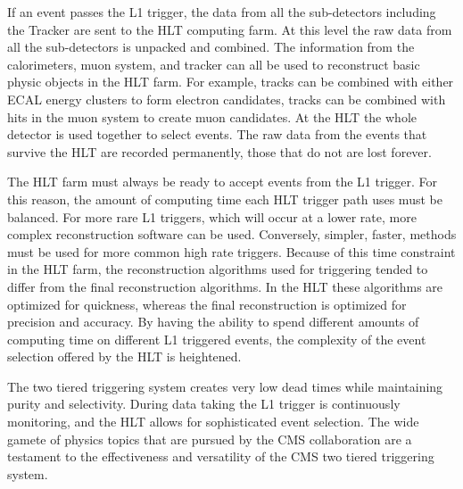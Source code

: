     If an event passes the L1 trigger, the data from all the sub-detectors
      \DIFdelbegin {}\DIFdelend including the Tracker are sent to the HLT computing farm. 
    At this level the raw data from all the sub-detectors is unpacked and 
      combined.
    The information from the calorimeters, muon system, and tracker can all 
      be used to reconstruct basic physic objects in the HLT farm. 
    For example, tracks can be combined with either ECAL energy clusters to 
      form electron candidates, tracks can be combined with hits in the muon
      system to create muon candidates.
    At the HLT the whole detector is used together to select events.
    The raw data from the events that survive the HLT are recorded permanently,
      those that do not are lost forever. 

    The HLT farm must always be ready to accept events from the L1 trigger.
    For this reason, the amount of computing time each HLT trigger path uses
      must be balanced.
    For more rare L1 triggers, which will occur at a lower rate, more 
      complex reconstruction software can be used.
    Conversely, simpler, faster, methods must be used for more common high
      rate triggers. 
    Because of this time constraint in the HLT farm, the reconstruction 
      algorithms used for triggering tended to differ from the final 
      reconstruction algorithms.
    In the HLT these algorithms are optimized for quickness, whereas the final 
      reconstruction is optimized for precision and accuracy.
    By having the ability to spend different amounts of computing time on 
      different L1 triggered events, the complexity of the event selection 
      offered by the HLT is heightened. 

    The two tiered triggering system creates very low dead times while 
      maintaining purity and selectivity.
    During data taking the L1 trigger is continuously monitoring, and the HLT
      allows for sophisticated event selection.
    The wide gamete of physics topics that are pursued by the CMS collaboration
      are a testament to the effectiveness and versatility of the CMS two 
      tiered triggering system. 

